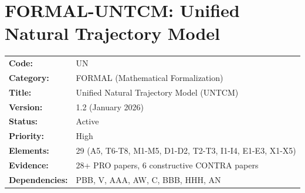 

\chapter{FORMAL-UNTCM: Unified Natural Trajectory Model}
\label{app:formal-untcm}

\begin{tcolorbox}[colback=gray!10!white, colframe=gray!75!black, title=Appendix Metadata]
\begin{tabular}{@{}ll@{}}
\textbf{Code:} & UN \\
\textbf{Category:} & FORMAL (Mathematical Formalization) \\
\textbf{Title:} & Unified Natural Trajectory Model (UNTCM) \\
\textbf{Version:} & 1.2 (January 2026) \\
\textbf{Status:} & Active \\
\textbf{Priority:} & High \\
\textbf{Elements:} & 29 (A5, T6-T8, M1-M5, D1-D2, T2-T3, I1-I4, E1-E3, X1-X5) \\
\textbf{Evidence:} & 28+ PRO papers, 6 constructive CONTRA papers \\
\textbf{Dependencies:} & PBB, V, AAA, AW, C, BBB, HHH, AN \\
\end{tabular}
\end{tcolorbox}

